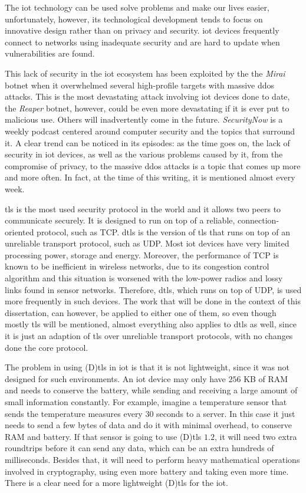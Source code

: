 \documentclass{llncs}
\begin{document}
{The \gls{iot} technology can be used solve problems and make our lives easier,
unfortunately, however, its technological development tends to focus on
innovative design rather than on privacy and security. \gls{iot} devices frequently
connect to networks using inadequate security and are hard to update when
vulnerabilities are found.

This lack of security in the \gls{iot} ecosystem has been exploited by the
the \textit{Mirai} botnet\cite{sec17ant94:online} when it overwhelmed several high-profile
targets with massive \gls{ddos} attacks. This is the most devastating attack involving \gls{iot}
devices done to date, the \textit{Reaper} botnet\cite{ReaperCa10:online}, however, could be
even more devastating if it is ever put to malicious use. Others will inadvertently
come in the future. \textit{SecurityNow}\cite{GRCSecur72:online} is a weekly podcast
centered around computer security and the topics that surround it. A clear trend can be noticed in its episodes: as the time goes on, the lack of
security in \gls{iot} devices, as well as the various problems caused by it, from
the compromise of privacy, to the massive \gls{ddos} attacks is a topic that comes up
more and more often. In fact, at the time of this writing, it is mentioned almost every week.

\gls{tls} is the most used security protocol in the world and it allows two peers
to communicate securely. It is designed to run on top of a reliable, connection-oriented
protocol, such as TCP. \gls{dtls} is the version of \gls{tls} that runs on top
of an unreliable transport protocol, such as UDP. Most \gls{iot} devices have
very limited processing power, storage and energy. Moreover, the performance of
TCP is known to be inefficient in wireless networks, due to its congestion control
algorithm and this situation is worsened with the low-power radios and lossy
links found in sensor networks. Therefore, \gls{dtls}, which runs on top
of UDP, is used more frequently in such devices. The work that will be done in the context of this dissertation, can however,
be applied to either one of them, so even though mostly
\gls{tls} will be mentioned, almost everything also applies to \gls{dtls} as well, since it is just
an adaption of \gls{tls} over unreliable transport protocols, with no changes done
the core protocol.

The problem in using (D)\gls{tls} in \gls{iot} is that it is not lightweight, since
it was not designed for such environments. An \gls{iot} device may only have
$256$ KB of RAM and needs to conserve the battery, while sending and receiving
a large amount of small information constantly. For example, imagine a temperature sensor
that sends the temperature measures every $30$ seconds to a server. In this case
it just needs to send a few bytes of data and do it with minimal overhead, to conserve
RAM and battery. If that sensor is going to use (D)\gls{tls} $1.2$, it will need
two extra roundtrips before it can send any data, which can be an extra hundreds of
milliseconds. Besides that, it will need to perform heavy mathematical operations
involved in cryptography, using even more battery and taking even more time.
There is a clear need for a more lightweight (D)\gls{tls} for the \gls{iot}.

}
\end{document}
